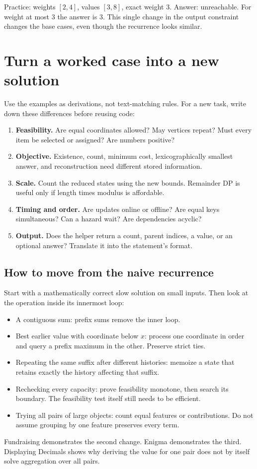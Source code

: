 Practice: weights $[2,4]$, values $[3,8]$, exact weight 3. Answer: unreachable.
For weight at most 3 the answer is 3. This single change in the output
constraint changes the base cases, even though the recurrence looks similar.

\section{Turn a worked case into a new solution}
Use the examples as derivations, not text-matching rules. For a new task,
write down these differences before reusing code:
\begin{enumerate}
\item \textbf{Feasibility.} Are equal coordinates allowed? May vertices
repeat? Must every item be selected or assigned? Are numbers positive?
\item \textbf{Objective.} Existence, count, minimum cost, lexicographically
smallest answer, and reconstruction need different stored information.
\item \textbf{Scale.} Count the reduced states using the new bounds.
Remainder DP is useful only if length times modulus is affordable.
\item \textbf{Timing and order.} Are updates online or offline? Are equal
keys simultaneous? Can a hazard wait? Are dependencies acyclic?
\item \textbf{Output.} Does the helper return a count, parent indices, a
value, or an optional answer? Translate it into the statement's format.
\end{enumerate}

\subsection{How to move from the naive recurrence}
Start with a mathematically correct slow solution on small inputs. Then
look at the operation inside its innermost loop:
\begin{itemize}
\item A contiguous sum: prefix sums remove the inner loop.
\item Best earlier value with coordinate below $x$: process one coordinate
in order and query a prefix maximum in the other. Preserve strict ties.
\item Repeating the same suffix after different histories: memoize a state
that retains exactly the history affecting that suffix.
\item Rechecking every capacity: prove feasibility monotone, then search
its boundary. The feasibility test itself still needs to be efficient.
\item Trying all pairs of large objects: count equal features or
contributions. Do not assume grouping by one feature preserves every term.
\end{itemize}
Fundraising demonstrates the second change. Enigma demonstrates the third.
Displaying Decimals shows why deriving the value for one pair does not by
itself solve aggregation over all pairs.

